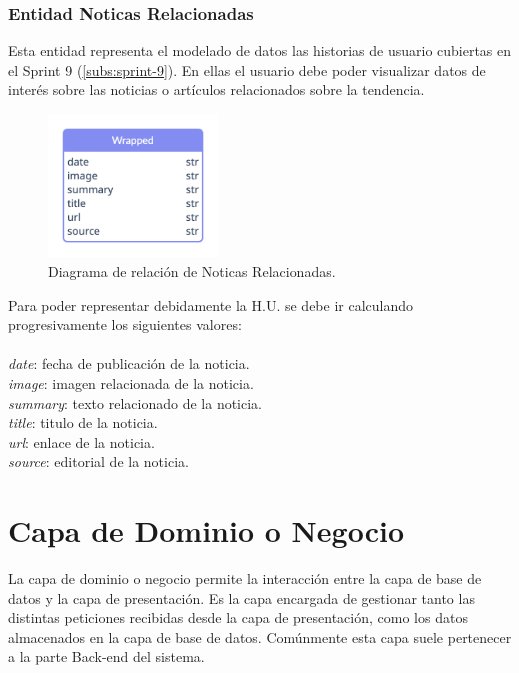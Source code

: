 \subsubsection{Entidad Noticas Relacionadas}\label{subsub:ent-noticias}
Esta entidad representa el modelado de datos las historias de usuario cubiertas en el Sprint 9 (\ref{subs:sprint-9}). En ellas el usuario debe poder visualizar datos de interés sobre las noticias o artículos relacionados sobre la tendencia.
\begin{figure}[H]
    \centering
    \myfloatalign
    \includegraphics[width=0.4\textwidth]{gfx/diagrama-er4.png}
    \caption[Diagrama de relación de Noticas Relacionadas]{Diagrama de relación de Noticas Relacionadas.}\label{gfx:diagrama-er4}
\end{figure}

Para poder representar debidamente la H.U. se debe ir calculando progresivamente los siguientes valores:
\\\\
\textit{date}: fecha de publicación de la noticia.  \\
\textit{image}: imagen relacionada de la noticia.    \\
\textit{summary}: texto relacionado de la noticia.    \\
\textit{title}: titulo de la noticia.    \\
\textit{url}: enlace de la noticia.    \\
\textit{source}: editorial de la noticia.

\section{Capa de Dominio o Negocio}
La capa de dominio o negocio permite la interacción entre la capa de base de datos y la capa de presentación. Es la capa encargada de gestionar tanto las distintas peticiones recibidas desde la capa de presentación, como los datos almacenados en la capa de base de datos. Comúnmente esta capa suele pertenecer a la parte Back-end del sistema.

